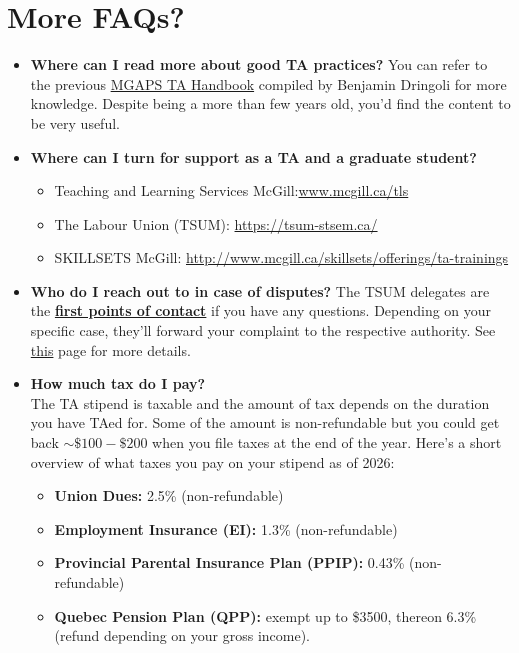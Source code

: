 \section{More FAQs?}
\begin{itemize}[leftmargin=10pt]
    \item \textbf{Where can I read more about good TA practices?} \newline
    You can refer to the previous  \href{https://mgaps.physics.mcgill.ca/files/Physics-TA-Handbook.pdf}{MGAPS TA Handbook} compiled by Benjamin Dringoli for more knowledge. Despite being a more than few years old, you'd find the content to be very useful.\\
    \item \textbf{Where can I turn for support as a TA and a graduate student?} \vspace{5pt}
    \begin{itemize}
        \item Teaching and Learning Services McGill:\url{www.mcgill.ca/tls}
        \item The Labour Union (TSUM): \url{https://tsum-stsem.ca/}
        \item SKILLSETS McGill: \url{http://www.mcgill.ca/skillsets/offerings/ta-trainings}\\
    \end{itemize}
    
    \item \textbf{Who do I reach out to in case of disputes?} 
    The TSUM delegates are the \href{https://mgaps.physics.mcgill.ca/people}{\textbf{first points of contact}} if you have any questions. Depending on your specific case, they'll forward your complaint to the respective authority. See \href{https://tsum-stsem.ca/your-rights/grievance-frequently-asked-questions/}{this} page for more details. \\
   
    \item \textbf{How much tax do I pay?}\\
    The TA stipend is taxable and the amount of tax depends on the duration you have TAed for. Some of the amount is non-refundable but you could get back $\sim \$100-\$200$ when you file taxes at the end of the year. Here's a short overview of what taxes you pay on your stipend as of 2026:
    \begin{itemize}
        \item \textbf{Union Dues:} 2.5\% (non-refundable)
        \item \textbf{Employment Insurance (EI):} 1.3\% (non-refundable)
        \item \textbf{Provincial Parental Insurance Plan (PPIP):} 0.43\% (non-refundable)
        \item \textbf{Quebec Pension Plan (QPP):} exempt up to \$3500, thereon 6.3\% (refund depending on your gross income).
    \end{itemize}
    

\end{itemize}
